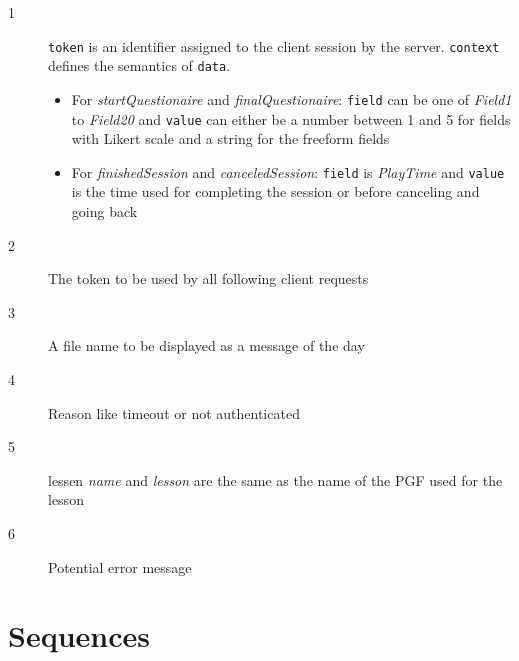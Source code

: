 \documentclass{scrartcl}
\begin{document}
\begin{description}
\item[{\footnotesize 1}] \texttt{token} is an identifier assigned to the client session by the server. \texttt{context} defines the semantics of \texttt{data}.

  \begin{itemize}
  \item For \emph{startQuestionaire} and \emph{finalQuestionaire}: \texttt{field} can be one of \emph{Field1} to \emph{Field20} and \texttt{value} can either be a number between 1 and 5 for fields with Likert scale and a string for the freeform fields
  \item For \emph{finishedSession} and \emph{canceledSession}: \texttt{field} is \emph{PlayTime} and \texttt{value} is the time used for completing the session or before canceling and going back
  \end{itemize}
\item[{\footnotesize 2}] The token to be used by all following client requests
\item[{\footnotesize 3}] A file name to be displayed as a message of the day
\item[{\footnotesize 4}] Reason like timeout or not authenticated
\item[{\footnotesize 5}] lessen \emph{name} and \emph{lesson} are the same as the name of the PGF used for the lesson
\item[{\footnotesize 6}] Potential error message
\end{description}
\section{Sequences}
\end{document}
